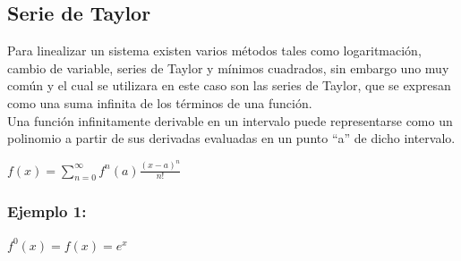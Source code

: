 \documentclass[a4paper,12pt,twoside]{proyectotanquesecci}
\begin{document}
\subsection{Serie de Taylor}

Para linealizar un sistema existen varios métodos tales como logaritmación, cambio de variable, series de Taylor y mínimos cuadrados, sin embargo uno muy común y el cual se utilizara en este caso son las series de Taylor, que se expresan como una suma infinita de los términos de una función.\\

Una función infinitamente derivable en un intervalo puede representarse como un polinomio a partir de sus derivadas evaluadas en un punto “a” de dicho intervalo.

\begin{center}
	$f\left( x\right) =\sum ^{\infty }_{n=0}f^{n}\left( a\right) \frac {\left( x-a\right) ^{n}}{n!}$
\end{center}

\subsubsection{Ejemplo 1:}

\begin{center}
	$f^{0}\left( x\right) =f\left( x\right) =e^{x}$
\end{center}
\end{document}
